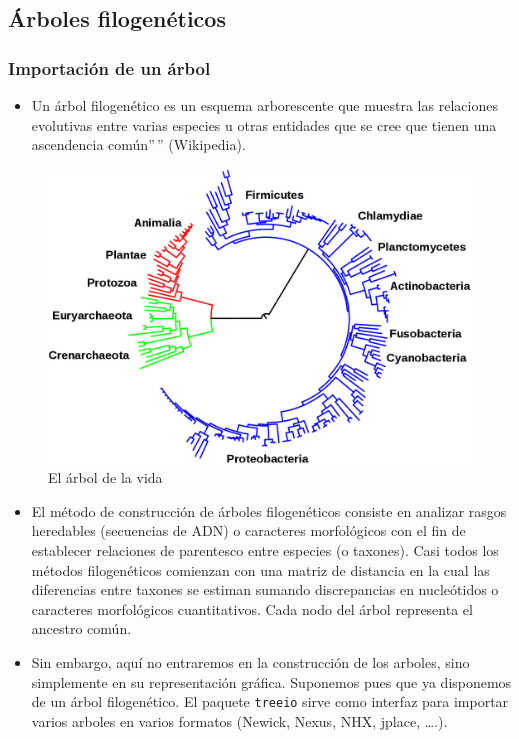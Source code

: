 \documentclass[
]{article}
\providecommand{\tightlist}{%
  \setlength{\itemsep}{0pt}\setlength{\parskip}{0pt}}
\numberwithin{ejcnt}{section}
\begin{document}
\hypertarget{uxe1rboles-filogenuxe9ticos}{%
\subsection{Árboles filogenéticos}\label{uxe1rboles-filogenuxe9ticos}}

\hypertarget{importaciuxf3n-de-un-uxe1rbol}{%
\subsubsection{Importación de un árbol}\label{importaciuxf3n-de-un-uxe1rbol}}

\begin{itemize}
\tightlist
\item
  Un árbol filogenético es un esquema arborescente que muestra las relaciones evolutivas entre varias especies u otras entidades que se cree que tienen una ascendencia común''\,'' (Wikipedia).
\end{itemize}

\begin{figure}
\centering
\includegraphics{imagenes/Tree_of_life_int.svg.png}
\caption{El árbol de la vida}
\end{figure}

\begin{itemize}
\item
  El método de construcción de árboles filogenéticos consiste en analizar rasgos heredables (secuencias de ADN) o caracteres morfológicos con el fin de establecer relaciones de parentesco entre especies (o taxones). Casi todos los métodos filogenéticos comienzan con una matriz de distancia en la cual las diferencias entre taxones se estiman sumando discrepancias en nucleótidos o caracteres morfológicos cuantitativos. Cada nodo del árbol representa el ancestro común.
\item
  Sin embargo, aquí no entraremos en la construcción de los arboles, sino simplemente en su representación gráfica. Suponemos pues que ya disponemos de un árbol filogenético. El paquete \texttt{treeio} sirve como interfaz para importar varios arboles en varios formatos (Newick, Nexus, NHX, jplace, \ldots.).
\end{itemize}
\end{document}
